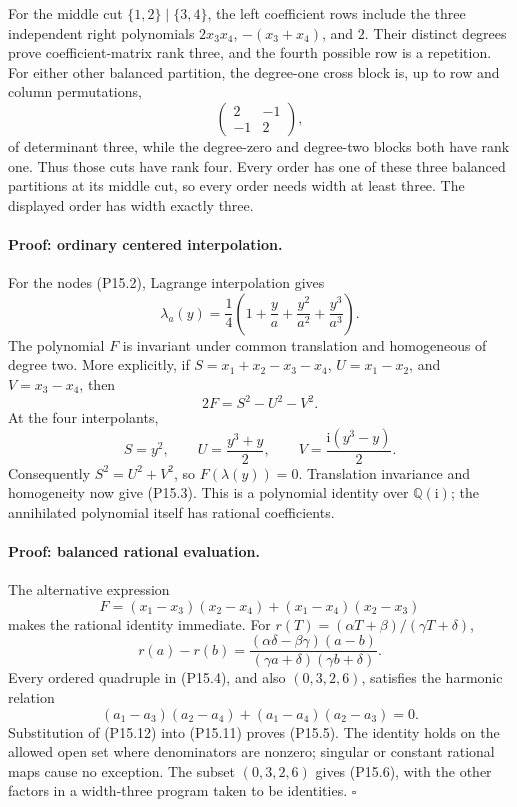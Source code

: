 For the middle cut $\{1,2\}\mid\{3,4\}$, the left coefficient
rows include the three independent right polynomials
$2x_3x_4$, $-(x_3+x_4)$, and $2$. Their distinct degrees prove
coefficient-matrix rank three, and the fourth possible row is
a repetition. For either other balanced partition, the
degree-one cross block is, up to row and column permutations,
\[
 \begin{pmatrix}2&-1\\-1&2\end{pmatrix},
\]
of determinant three, while the degree-zero and degree-two
blocks both have rank one. Thus those cuts have rank four.
Every order has one of these three balanced partitions at its
middle cut, so every order needs width at least three. The
displayed order has width exactly three.

\paragraph{Proof: ordinary centered interpolation.}
For the nodes (P15.2), Lagrange interpolation gives
\[
 \lambda_a(y)=\frac14
    \left(1+\frac{y}{a}+\frac{y^2}{a^2}+\frac{y^3}{a^3}\right).
 \tag{P15.9}
\]
The polynomial $F$ is invariant under common translation and
homogeneous of degree two. More explicitly, if
$S=x_1+x_2-x_3-x_4$, $U=x_1-x_2$, and $V=x_3-x_4$, then
\[
 2F=S^2-U^2-V^2.
 \tag{P15.10}
\]
At the four interpolants,
\[
 S=y^2,\qquad U=\frac{y^3+y}{2},\qquad
 V=\frac{\mathrm i(y^3-y)}2.
\]
Consequently $S^2=U^2+V^2$, so $F(\lambda(y))=0$.
Translation invariance and homogeneity now give (P15.3).
This is a polynomial identity over $\mathbb Q(\mathrm i)$;
the annihilated polynomial itself has rational coefficients.

\paragraph{Proof: balanced rational evaluation.}
The alternative expression
\[
 F=(x_1-x_3)(x_2-x_4)+(x_1-x_4)(x_2-x_3)
 \tag{P15.11}
\]
makes the rational identity immediate. For
$r(T)=(\alpha T+\beta)/(\gamma T+\delta)$,
\[
 r(a)-r(b)=
 \frac{(\alpha\delta-\beta\gamma)(a-b)}
      {(\gamma a+\delta)(\gamma b+\delta)}.
 \tag{P15.12}
\]
Every ordered quadruple in (P15.4), and also $(0,3,2,6)$,
satisfies the harmonic relation
\[
 (a_1-a_3)(a_2-a_4)+(a_1-a_4)(a_2-a_3)=0.
 \tag{P15.13}
\]
Substitution of (P15.12) into (P15.11) proves (P15.5).
The identity holds on the allowed open set where denominators
are nonzero; singular or constant rational maps cause no
exception. The subset $(0,3,2,6)$ gives (P15.6), with the
other factors in a width-three program taken to be identities.
$\square$

